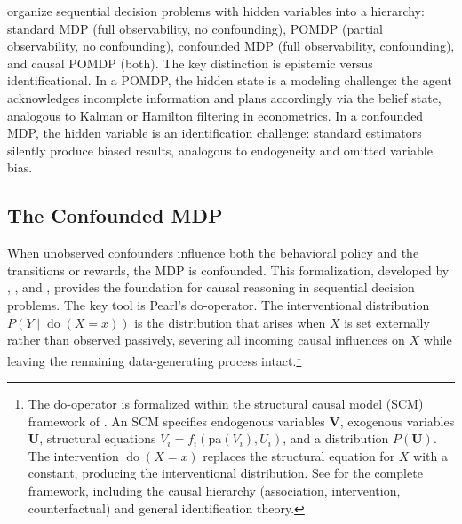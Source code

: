 \citet{dacostacunha2025unifying} organize sequential decision problems with hidden variables into a hierarchy: standard MDP (full observability, no confounding), POMDP (partial observability, no confounding), confounded MDP (full observability, confounding), and causal POMDP (both). The key distinction is epistemic versus identificational. In a POMDP, the hidden state is a modeling challenge: the agent acknowledges incomplete information and plans accordingly via the belief state, analogous to Kalman or Hamilton filtering in econometrics. In a confounded MDP, the hidden variable is an identification challenge: standard estimators silently produce biased results, analogous to endogeneity and omitted variable bias.

\subsection{The Confounded MDP}
\label{subsec:confounded_mdp}

When unobserved confounders influence both the behavioral policy and the transitions or rewards, the MDP is confounded. This formalization, developed by \citet{zhang2019near}, \citet{zhang2020causal}, and \citet{kallus2020confounding}, provides the foundation for causal reasoning in sequential decision problems. The key tool is Pearl's do-operator. The interventional distribution $P(Y \mid \operatorname{do}(X = x))$ is the distribution that arises when $X$ is set externally rather than observed passively, severing all incoming causal influences on $X$ while leaving the remaining data-generating process intact.\footnote{The do-operator is formalized within the structural causal model (SCM) framework of \citet{pearl2009causality}. An SCM specifies endogenous variables $\mathbf{V}$, exogenous variables $\mathbf{U}$, structural equations $V_i = f_i(\text{pa}(V_i), U_i)$, and a distribution $P(\mathbf{U})$. The intervention $\operatorname{do}(X = x)$ replaces the structural equation for $X$ with a constant, producing the interventional distribution. See \citet{pearl2009causality} for the complete framework, including the causal hierarchy (association, intervention, counterfactual) and general identification theory.}

